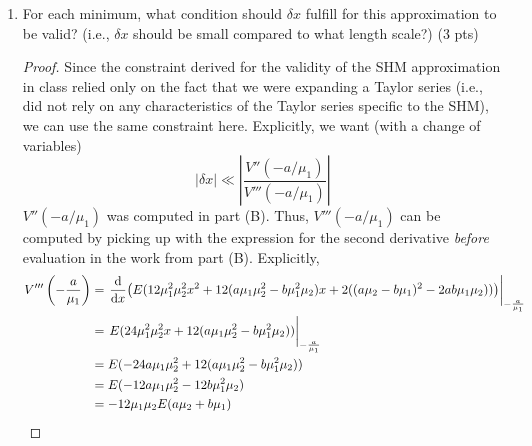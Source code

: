 \documentclass[../psets.tex]{subfiles}
\begin{document}
\begin{enumerate}
\begin{enumerate}
\begin{proof}
\begin{align*}
                &= E(2a^2\mu_2^2+4ab\mu_1\mu_2+2b^2\mu_1^2)\\
                &= 2E(a\mu_2+b\mu_1)^2
            \end{align*}
            Therefore, the desired expression for the potential energy a distance $\delta x$ from the minimum at $x=-a/\mu_1$ up to second order in $\delta x$ is
            \begin{equation*}
                \boxed{\tilde{V}(\delta x) = E(a\mu_2+b\mu_1)^2(\delta x)^2}
            \end{equation*}
            In fact, because $V''(x)$ is a parabola with the same bilateral symmetry as $V(x)$, we have that $V''(-a/\mu_1)=V''(b/\mu_2)$. Therefore, the above expression is actually applicable the minimum at $x=b/\mu_2$ as well.
        \end{proof}
        \item For each minimum, what condition should $\delta x$ fulfill for this approximation to be valid? (i.e., $\delta x$ should be small compared to what length scale?) (3 pts)
        \begin{proof}
            Since the constraint derived for the validity of the SHM approximation in class relied only on the fact that we were expanding a Taylor series (i.e., did not rely on any characteristics of the Taylor series specific to the SHM), we can use the same constraint here. Explicitly, we want (with a change of variables)
            \begin{equation*}
                |\delta x| \ll \left| \frac{V''(-a/\mu_1)}{V'''(-a/\mu_1)} \right|
            \end{equation*}
            $V''(-a/\mu_1)$ was computed in part (B). Thus, $V'''(-a/\mu_1)$ can be computed by picking up with the expression for the second derivative \emph{before} evaluation in the work from part (B). Explicitly,
            \begin{align*}
                V'''\left( -\frac{a}{\mu_1} \right) &= \eval{\dv{x}(E(12\mu_1^2\mu_2^2x^2+12(a\mu_1\mu_2^2-b\mu_1^2\mu_2)x+2((a\mu_2-b\mu_1)^2-2ab\mu_1\mu_2)))}_{-\frac{a}{\mu_1}}\\
                &= \eval{E(24\mu_1^2\mu_2^2x+12(a\mu_1\mu_2^2-b\mu_1^2\mu_2))}_{-\frac{a}{\mu_1}}\\
                &= E(-24a\mu_1\mu_2^2+12(a\mu_1\mu_2^2-b\mu_1^2\mu_2))\\
                &= E(-12a\mu_1\mu_2^2-12b\mu_1^2\mu_2)\\
                &= -12\mu_1\mu_2E(a\mu_2+b\mu_1)

\end{align*}
\end{proof}
\end{enumerate}
\end{enumerate}
\end{document}
